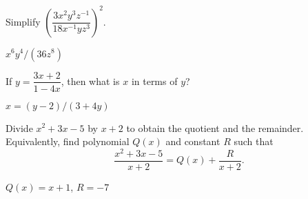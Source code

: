 \begin{enumialphparenastyle}
\begin{ex}
Simplify $\left(\dfrac{3x^2 y^3 z^{-1}}{18x^{-1}yz^3}\right)^2$.
\begin{sol}
	$x^6 y^4/(36z^8)$
\end{sol}
\end{ex}

\begin{ex}
If $y=\dfrac{3x+2}{1-4x}$, then what is $x$ in
terms of $y$?
\begin{sol}
	$x=(y-2)/(3+4y)$
\end{sol}
\end{ex}

\begin{ex}
Divide $x^2+3x-5$ by $x+2$ to obtain the
quotient and the remainder. Equivalently, find polynomial $Q(x)$
and constant $R$ such that
\[\frac{x^2+3x-5}{x+2}=Q(x)+\frac{R}{x+2}.\]
\begin{sol}
	$Q(x)=x+1$, $R=-7$
\end{sol}
\end{ex}

\end{enumialphparenastyle}